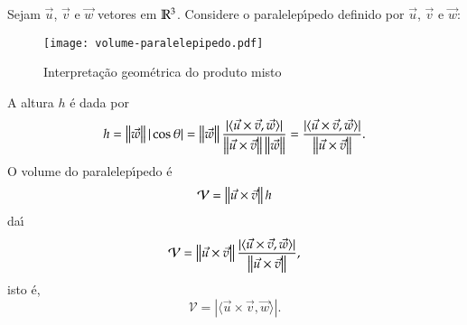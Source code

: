 Sejam $\vec{u}$, $\vec{v}$ e $\vec{w}$ vetores em $\mathbb{R}^3$. Considere o paralelep{\'\i}pedo definido por $\vec{u}$, $\vec{v}$ e $\vec{w}$:
\begin{figure}[!h]
  \centering
  \caption{Interpreta\c{c}\~ao geom\'etrica do produto misto}
  \texttt{[image: volume-paralelepipedo.pdf]}




\end{figure}

A altura $h$ \'e dada por
\begin{align*}
  h = \left\Vert{\vec{w}}\right\Vert|\cos\theta| = \left\Vert{\vec{w}}\right\Vert\dfrac{|\langle\vec{u}\times\vec{v}, \vec{w}\rangle|}{\left\Vert{\vec{u}\times\vec{v}}\right\Vert\left\Vert{\vec{w}}\right\Vert} = \dfrac{|\langle\vec{u}\times\vec{v}, \vec{w}\rangle|}{\left\Vert{\vec{u}\times\vec{v}}\right\Vert}.
\end{align*}
O volume do paralelep{\'\i}pedo \'e
\[
  \mathcal{V} = \left\Vert{\vec{u}\times\vec{v}}\right\Vert h
\]
da{\'\i}
\[
  \mathcal{V} = \left\Vert{\vec{u}\times\vec{v}}\right\Vert\dfrac{|\langle\vec{u}\times\vec{v}, \vec{w}\rangle|}{\left\Vert{\vec{u}\times\vec{v}}\right\Vert},
\]
isto \'e,
\begin{equation}
  \mathcal{V} = |\langle\vec{u}\times\vec{v}, \vec{w}\rangle|.
\end{equation}

